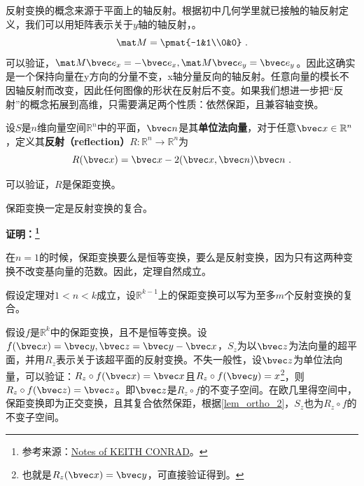 
\begin{issues}
\issueMissDepend
\end{issues}

反射变换的概念来源于平面上的轴反射。根据初中几何学里就已接触的轴反射定义，我们可以用矩阵表示关于$y$轴的轴反射，。
\begin{equation}
\mat M=\pmat{-1&1\\0&0}~.
\end{equation}
可以验证，$\mat M\bvec e_x=-\bvec e_x,\mat M \bvec e_y=\bvec e_y$。因此这确实是一个保持向量在y方向的分量不变，x轴分量反向的轴反射。任意向量的模长不因轴反射而改变，因此任何图像的形状在反射后不变。如果我们想进一步把“反射”的概念拓展到高维，只需要满足两个性质：依然保距，且兼容轴变换。




\begin{definition}{}
设$S$是$n$维向量空间$\mathbb R^n$中的平面，$\bvec n$是其\textbf{单位法向量}，对于任意$\bvec x\in \mathbb R^n$，定义其\textbf{反射（reflection）}$R:\mathbb R^n\rightarrow \mathbb R^n$为
\begin{equation}
R(\bvec x)=\bvec x-2(\bvec x,\bvec n)\bvec n~.
\end{equation}
\end{definition}
可以验证，$R$是保距变换。


\begin{theorem}{}
保距变换一定是反射变换的复合。
\end{theorem}
\textbf{证明：\footnote{参考来源：\href{https://kconrad.math.uconn.edu/blurbs/grouptheory/isometryRn.pdf}{Notes of KEITH CONRAD}。}}

在$n=1$的时候，保距变换要么是恒等变换，要么是反射变换，因为只有这两种变换不改变基向量的范数。因此，定理自然成立。

假设定理对$1<n<k$成立，设$\mathbb R^{k-1}$上的保距变换可以写为至多$m$个反射变换的复合。 

假设$f$是$\mathbb R^k$中的保距变换，且不是恒等变换。设$f(\bvec x)=\bvec y,\bvec z=\bvec y-\bvec x$，$S_z$为以$\bvec z$为法向量的超平面，并用$R_z$表示关于该超平面的反射变换。不失一般性，设$\bvec z$为单位法向量，可以验证：$R_z\circ f(\bvec x)=\bvec x$且$R_z\circ f(\bvec y)=x$\footnote{也就是$R_z(\bvec x)=\bvec y$，可直接验证得到。}，则$R_z\circ f(\bvec z)=\bvec z$。即$\bvec z$是$R_z\circ f$的不变子空间。在欧几里得空间中，保距变换即为正交变换，且其复合依然保距，根据\autoref{lem_ortho_2}，$S_z$也为$R_z\circ f$的不变子空间。

